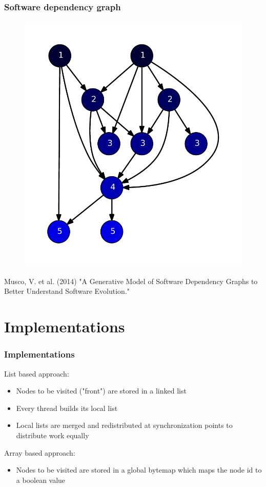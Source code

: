 \begin{frame}
\frametitle{Software dependency graph}
\begin{figure}[!hbp]
    \includegraphics[height=0.7\textheight]{img/software10.pdf}

\end{figure}
{\color{gray}\tiny Musco, V. et al. (2014) "A Generative Model of Software Dependency Graphs to Better Understand Software Evolution."}
\end{frame}


\section{Implementations}

\begin{frame}
\frametitle{Implementations}

List based approach:
\begin{itemize}
\item Nodes to be visited ("front") are stored in a linked list
\item Every thread builds its local list
\item Local lists are merged and redistributed at synchronization points to distribute work equally
\end{itemize}

Array based approach:
\begin{itemize}
\item Nodes to be visited are stored in a global bytemap which maps the node id to a boolean value
\end{itemize}

\end{frame}

